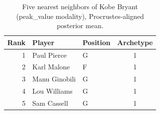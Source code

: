 \begin{table}[htbp]
  \centering\small
  \begin{tabular}{rllc}
    \toprule
    Rank & Player & Position & Archetype \\
    \midrule
    1 & Paul Pierce & G & 1 \\
    2 & Karl Malone & F & 1 \\
    3 & Manu Ginobili & G & 1 \\
    4 & Lou Williams & G & 1 \\
    5 & Sam Cassell & G & 1 \\
    \bottomrule
  \end{tabular}
  \caption{Five nearest neighbors of Kobe Bryant (peak_value modality), Procrustes-aligned posterior mean.}
  \label{tab:Kobe_Bryant_neighbors_peak_value}
\end{table}

